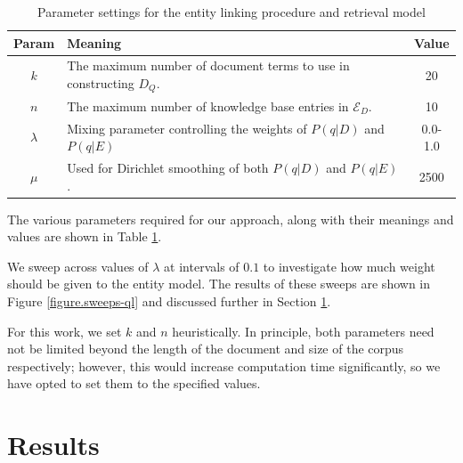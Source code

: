 \documentclass{sig-alternate}
\begin{document}
\begin{table}[htbp]
\centering
\begin{tabular}{|c|p{}|c|} \hline
{\bf Param} & {\bf Meaning} & {\bf Value} \\ \hline
$k$ & The maximum number of document terms to use in constructing $D_Q$. & 20 \\ \hline
$n$ & The maximum number of knowledge base entries in $\mathcal{E}_D$. & 10 \\ \hline
$\lambda$ & Mixing parameter controlling the weights of $P(q|D)$ and $P(q|E)$ & 0.0-1.0 \\ \hline
$\mu$ & Used for Dirichlet smoothing of both $P(q|D)$ and $P(q|E)$. & 2500 \\ \hline
\end{tabular}
\caption{Parameter settings for the entity linking procedure and retrieval model}
\label{table.parameters}
\end{table}

The various parameters required for our approach, along with their meanings and values are shown in Table \ref{table.parameters}. 

We sweep across values of $\lambda$ at intervals of $0.1$ to investigate how much weight should be given to the entity model. The results of these sweeps are shown in Figure \ref{figure.sweeps-ql} and discussed further in Section \ref{section.results}.

For this work, we set $k$ and $n$ heuristically. In principle, both parameters need not be limited beyond the length of the document and size of the corpus respectively; however, this would increase computation time significantly, so we have opted to set them to the specified values.

\section{Results}\label{section.results}
\end{document}
